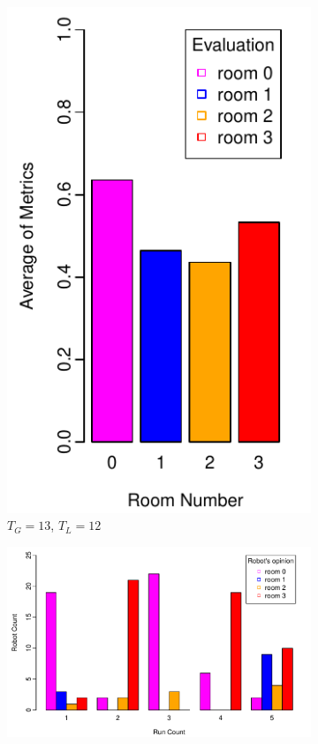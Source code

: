 \documentclass{llncs}
\begin{document}
	\begin{figure}[h!]
        \centering
        \begin{subfigure}[b]{0.25\textwidth}
                \includegraphics[width=\textwidth]{PLOT/EVAL/eval4}
                \caption{$T_G = 13$, $T_L = 12$}
                \label{fig:eval1}
        \end{subfigure}%
        \qquad
        \begin{subfigure}[b]{0.67\textwidth}
                \includegraphics[width=\textwidth]{PLOT/EXP/exp4}

\end{subfigure}
\end{figure}
\end{document}
